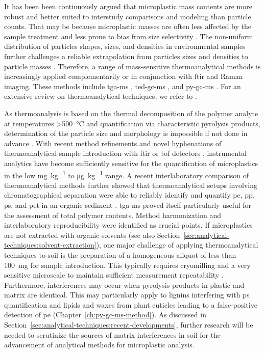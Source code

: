 It has been been continuously argued that microplastic mass contents are more robust and better suited to interstudy comparisons and modeling than particle counts. That may be because microplastic masses are often less affected by the sample treatment and less prone to bias from size selectivity \citep{SimonQuantification2018,BraunMicroplastics2018}. The non-uniform distribution of particles shapes, sizes, and densities in environmental samples further challenges a reliable extrapolation from particles sizes and densities to particle masses \citep{BraunMicroplastics2018}. Therefore, a range of mass-sensitive thermoanalytical methods is increasingly applied complementarily or in conjunction with \ac{ftir} and Raman imaging. These methods include \ac{tga-ms} \citep[Chapter~\ref{ch:tga-ms-method};][]{BoyronAdvanced2019},
\ac{ted-gc-ms} \citep{DumichenFast2017}, and \ac{py-gc-ms} \citep{FischerSimultaneous2017,FischerMicroplastics2019}. For an extensive review on thermoanalytical techniques, we refer to \citet{LaNasaReview2020}.

As thermoanalysis is based on the thermal decomposition of the polymer analyte at temperatures \SI{>500}{\degreeCelsius} and quantification via characteristic pyrolysis products, determination of the particle size and morphology is impossible if not done in advance \citep{NguyenSeparation2019,DumichenFast2017}. With recent method refinements \citep[Chapter~\ref{ch:py-gc-ms-method};][]{DierkesQuantification2019} and novel hyphenations of thermoanalytical sample introduction with \ac{ftir} or \ac{tof}
detectors \citep{SullivanDetection2020}, instrumental analytics have become sufficiently sensitive for the quantification of microplastics in the low \si{\milli\gram\per\kilo\gram} to \si{\micro\gram\per\kilo\gram} range. A recent interlaboratory comparison of thermoanalytical methods further showed that thermoanalytical setups involving chromatographical separation were able to reliably identify and quantify \ac{pe}, \ac{pp}, \ac{ps}, and \ac{pet} in an organic sediment \citep{BeckerQuantification2020}. \ac{tga-ms} proved itself particularly useful for the assessment of total polymer contents.
Method harmonization and interlaboratory reproducibility were identified as crucial points. If microplastics are not extracted with organic solvents (see also Section~\ref{sec:analytical-techniques:solvent-extraction}), one major challenge of applying thermoanalytical techniques to soil is the preparation of a homogeneous aliquot of less than \SI{100}{\milli\gram} for sample introduction. This typically requires cryomilling and a very sensitive microscale to maintain sufficient measurement repeatability \citep[Chapter~\ref{ch:py-gc-ms-method};][]{DierkesQuantification2019}.
Furthermore, interferences may occur when pyrolysis products in plastic and matrix are identical. This may particularly apply to lignins interfering with \ac{ps} quantification \citep{FischerSimultaneous2017} and lipids and waxes from plant cuticles leading to a false-positive detection of \ac{pe} (Chapter~\ref{ch:py-gc-ms-method}). As discussed in Section~\ref{sec:analytical-techniques:recent-developments}, further research will be needed to scrutinize the sources of matrix interferences in soil for the advancement of analytical methods for microplastic analysis.

